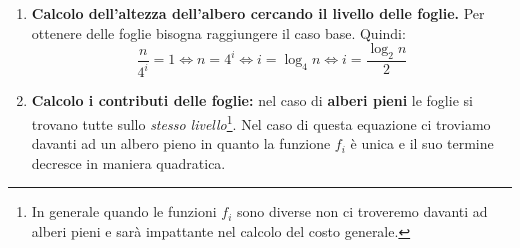\begin{enumerate}
	\item \textbf{Calcolo dell'altezza dell'albero cercando il livello delle foglie.} Per ottenere delle foglie bisogna raggiungere il caso base. Quindi:
	\begin{displaymath}
	\frac{n}{4^{i}}=1 \Leftrightarrow n=4^{i} \Leftrightarrow i= \log_{4} n \Leftrightarrow i=\frac{\log_{2}n}{2}
	\end{displaymath}
	\item \textbf{Calcolo i contributi delle foglie:} nel caso di \textbf{alberi pieni} le foglie si trovano tutte sullo \textit{stesso livello}\footnote{In generale quando le funzioni $f_{i}$ sono diverse non ci troveremo davanti ad alberi pieni e sarà impattante nel calcolo del costo generale.}. Nel caso di questa equazione ci troviamo davanti ad un albero pieno in quanto la funzione $f_{i}$ è unica e il suo termine decresce in maniera quadratica.


\end{enumerate}
